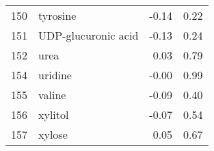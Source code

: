 \begin{tabular}{llrr}
150 &                           tyrosine &                -0.14 &     0.22 \\
151 &                UDP-glucuronic acid &                -0.13 &     0.24 \\
152 &                               urea &                 0.03 &     0.79 \\
154 &                            uridine &                -0.00 &     0.99 \\
155 &                             valine &                -0.09 &     0.40 \\
156 &                            xylitol &                -0.07 &     0.54 \\
157 &                             xylose &                 0.05 &     0.67 \\
\bottomrule
\end{tabular}
